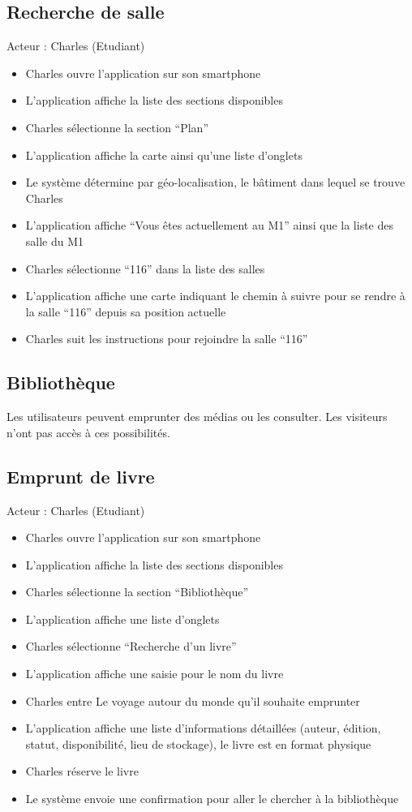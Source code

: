 \subsection*{Recherche de salle}
Acteur : Charles (Etudiant)
\begin{itemize}
\item Charles ouvre l’application sur son smartphone 
\item L’application affiche la liste des sections disponibles 
\item Charles sélectionne la section “Plan” 
\item L’application affiche la carte ainsi qu’une liste d’onglets 
\item Le système détermine par géo-localisation, le bâtiment dans lequel se trouve Charles 
\item L’application affiche “Vous êtes actuellement au M1” ainsi que la liste des salle du M1 
\item Charles sélectionne “116” dans la liste des salles 
\item L’application affiche une carte indiquant le chemin à suivre pour se rendre à la salle “116” depuis sa position actuelle 
\item Charles suit les instructions pour rejoindre la salle “116” 
\end{itemize}

\newpage

\subsection{Bibliothèque}

Les utilisateurs peuvent emprunter des médias ou les consulter. Les visiteurs n'ont pas accès à ces possibilités.

\subsection*{Emprunt de livre}
Acteur : Charles (Etudiant)
\begin{itemize}
\item Charles ouvre l’application sur son smartphone 
\item L’application affiche la liste des sections disponibles 
\item Charles sélectionne la section “Bibliothèque” 
\item L’application affiche une liste d’onglets 
\item Charles sélectionne “Recherche d’un livre” 
\item L’application affiche une saisie pour le nom du livre 
\item Charles entre Le voyage autour du monde qu’il souhaite emprunter 
\item L’application affiche une liste d’informations détaillées (auteur, édition, statut, disponibilité, lieu de stockage), le livre est en format physique 
\item Charles réserve le livre  
\item Le système envoie une confirmation pour aller le chercher à la bibliothèque 
\end{itemize}

